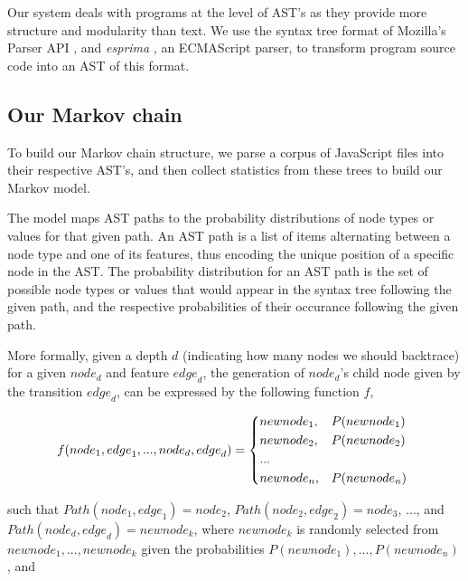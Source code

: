 \documentclass{article}
\begin{document}
Our system deals with programs at the level of AST's as they provide more structure and modularity than text.
We use the syntax tree format of Mozilla's Parser API \cite{parser api}, and \emph{esprima} \cite{esprima}, an ECMAScript
parser, to transform program source code into an AST of this format.


\subsection{Our Markov chain}

To build our Markov chain structure, we parse a corpus of JavaScript files into their
respective AST's, and then collect statistics from these trees to build our Markov model. 

The model maps AST paths to the probability distributions of node types or values for that given
path. An AST path is a list of items alternating between a node type and one of its features, thus encoding the unique position of a 
specific node in the AST. The probability distribution for an AST path is the set of possible node types or values that would appear in the
syntax tree following the given path, and the respective probabilities of their
occurance following the given path.

More formally, given a depth $d$ (indicating how many nodes we should backtrace) for a given
${node}_d$ and feature ${edge}_d$, the generation of ${node}_d$'s child node given by the
transition ${edge}_d$, can be expressed by the following function $f$,

\begin{align*}
f({node}_1, {edge}_1, ..., {node}_{d}, {edge}_{d}) = \begin{dcases*}
		{newnode_1},	&	$P({newnode_1})$ \\
		{newnode_2},	&	$P({newnode_2})$ \\
		...\\
		{newnode_n},    &   $P({newnode_n})$ \\
	\end{dcases*}
\end{align*}

such that ${Path}({node}_1, {edge}_1) = {node}_2$, ${Path}({node}_2, {edge}_2) = {node}_3$, ..., and ${Path}({node}_d, {edge}_d) = {newnode}_k$, where ${newnode}_k$ is randomly selected from ${newnode}_1, ..., {newnode}_k$ given the probabilities $P({newnode_1}), ..., P({newnode_n})$, and
\end{document}
